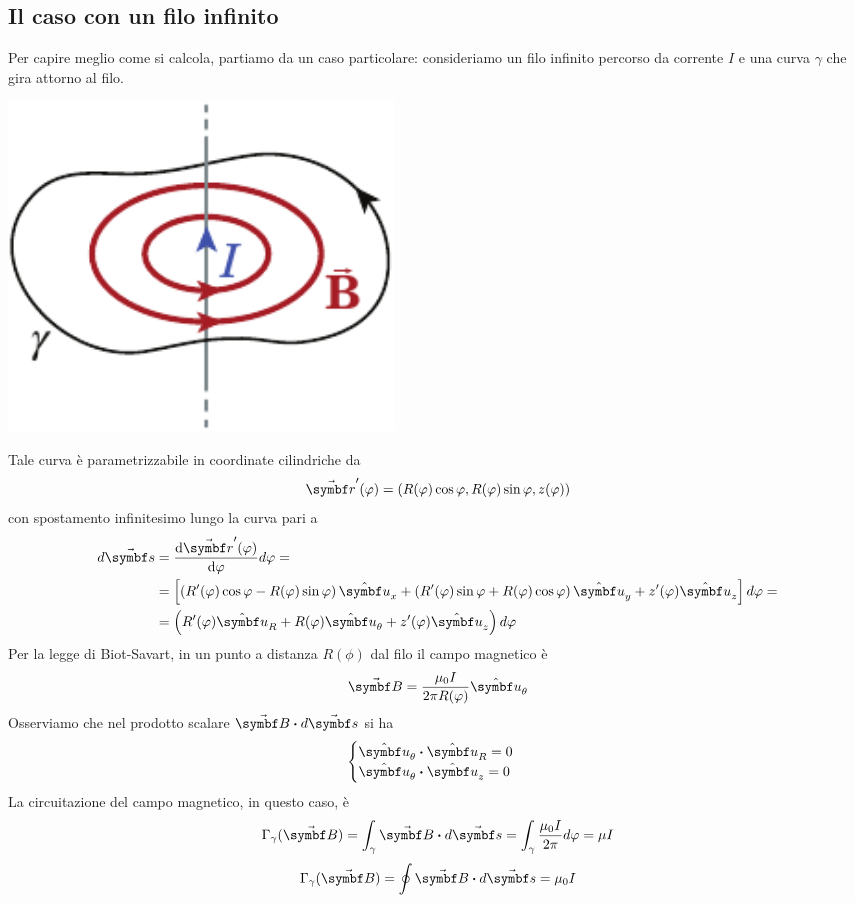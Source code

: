 \subsection{Il caso con un filo infinito}
Per capire meglio come si calcola, partiamo da un caso particolare: consideriamo un filo infinito percorso da corrente $I$ e una curva $\gamma$ che gira attorno al filo.
\begin{center}
	\includegraphics[width=0.45\textwidth]{images/chp9/chp9leggeampere1.pdf}
\end{center}
Tale curva è parametrizzabile in coordinate cilindriche da
\begin{equation*}
	\vba{r}'(\phi)=\left(R(\phi)\cos\phi,R(\phi)\sin\phi,z(\phi)\right)
\end{equation*}
con spostamento infinitesimo lungo la curva pari a
\begin{align*}
	d\vba{s}&=\dv{\vba{r}'(\phi)}{\phi}d\phi=\\
	&=\left[\left(R'(\phi)\cos\phi-R(\phi)\sin\phi\right)\vbh{u}_x+\left(R'(\phi)\sin\phi+R(\phi)\cos\phi\right)\vbh{u}_y+z'(\phi)\vbh{u}_z\right]d\phi=\\
	&=\left(R'(\phi)\vbh{u}_R+R(\phi)\vbh{u}_{\theta}+z'(\phi)\vbh{u}_z\right)d\phi
\end{align*}
Per la legge di Biot-Savart, in un punto a distanza $R(\phi)$ dal filo il campo magnetico è
\begin{equation*}
	\vba{B}=\frac{\mu_0 I}{2\pi R(\phi)}\vbh{u}_{\theta}
\end{equation*}
Osserviamo che nel prodotto scalare $\vba{B}\vdot d\vba{s}$ si ha
\begin{equation*}
	\begin{cases}
		\vbh{u}_\theta\vdot\vbh{u}_R=0\\
		\vbh{u}_\theta\vdot\vbh{u}_z=0
	\end{cases}
\end{equation*}
La circuitazione del campo magnetico, in questo caso, è
\begin{equation*}
	\Gamma_{\gamma}(\vba{B})=\int_{\gamma}\vba{B}\vdot d\vba{s}=\int_{\gamma}\frac{\mu_0 I}{2\pi}d\phi=\mu I
\end{equation*}
\begin{equation}
	\Gamma_{\gamma}(\vba{B})=\oint \vba{B}\vdot d\vba{s}=\mu_0 I
\end{equation}

